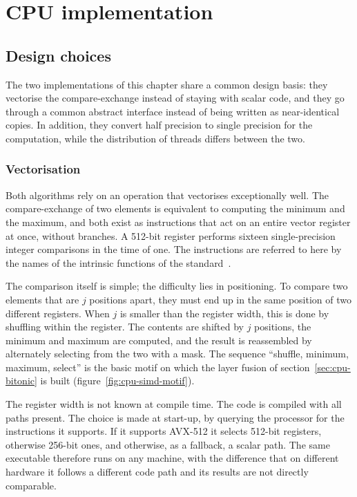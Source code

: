 \chapter{CPU implementation}
\label{ch:cpu}

\section{Design choices}
\label{sec:cpu-design}

The two implementations of this chapter share a common design basis: they
vectorise the compare-exchange instead of staying with scalar code, and they go
through a common abstract interface instead of being written as near-identical
copies. In addition, they convert half precision to single precision for the
computation, while the distribution of threads differs between the two.

\subsection{Vectorisation}
\label{sec:cpu-simd}

Both algorithms rely on an operation that vectorises exceptionally well. The
compare-exchange of two elements is equivalent to computing the minimum and the
maximum, and both exist as instructions that act on an entire vector register
at once, without branches. A 512-bit register performs sixteen single-precision
integer comparisons in the time of one. The instructions are referred to here
by the names of the intrinsic functions of the standard~\cite{intelintrinsics}.

The comparison itself is simple; the difficulty lies in positioning. To compare
two elements that are $j$ positions apart, they must end up in the same
position of two different registers. When $j$ is smaller than the register
width, this is done by shuffling within the register. The contents are shifted
by $j$ positions, the minimum and maximum are computed, and the result is
reassembled by alternately selecting from the two with a mask. The sequence
``shuffle, minimum, maximum, select'' is the basic motif on which the layer
fusion of section~\ref{sec:cpu-bitonic} is built
(figure~\ref{fig:cpu-simd-motif}).



The register width is not known at compile time. The code is compiled with all
paths present. The choice is made at start-up, by querying the processor for
the instructions it supports. If it supports AVX-512 it selects 512-bit
registers, otherwise 256-bit ones, and otherwise, as a fallback, a scalar path.
The same executable therefore runs on any machine, with the difference that on
different hardware it follows a different code path and its results are not
directly comparable.


